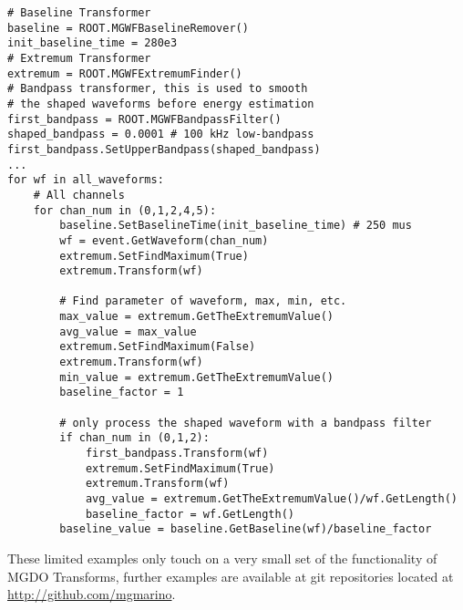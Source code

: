 	\lstset{
	   language=Python}			
			\begin{lstlisting}[caption=Calculating general waveform characteristics in Python]			
# Baseline Transformer
baseline = ROOT.MGWFBaselineRemover()
init_baseline_time = 280e3
# Extremum Transformer
extremum = ROOT.MGWFExtremumFinder()
# Bandpass transformer, this is used to smooth
# the shaped waveforms before energy estimation 
first_bandpass = ROOT.MGWFBandpassFilter()
shaped_bandpass = 0.0001 # 100 kHz low-bandpass
first_bandpass.SetUpperBandpass(shaped_bandpass)
...
for wf in all_waveforms:
    # All channels
    for chan_num in (0,1,2,4,5):
        baseline.SetBaselineTime(init_baseline_time) # 250 mus
        wf = event.GetWaveform(chan_num)
        extremum.SetFindMaximum(True)
        extremum.Transform(wf)

        # Find parameter of waveform, max, min, etc.
        max_value = extremum.GetTheExtremumValue()
        avg_value = max_value
        extremum.SetFindMaximum(False)
        extremum.Transform(wf)
        min_value = extremum.GetTheExtremumValue()
        baseline_factor = 1

        # only process the shaped waveform with a bandpass filter
        if chan_num in (0,1,2):
            first_bandpass.Transform(wf)
            extremum.SetFindMaximum(True)
            extremum.Transform(wf)
            avg_value = extremum.GetTheExtremumValue()/wf.GetLength()
            baseline_factor = wf.GetLength()
        baseline_value = baseline.GetBaseline(wf)/baseline_factor
			\end{lstlisting}	

These limited examples only touch on a very small set of the functionality of MGDO Transforms, further examples are available at git repositories located at \url{http://github.com/mgmarino}.
	
	
